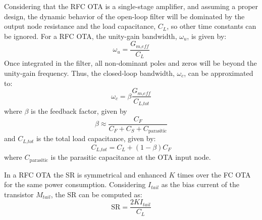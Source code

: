 Considering that the RFC OTA is a single-stage amplifier, and assuming a proper design, the dynamic behavior of the open-loop filter will be dominated by the output node resistance and the load capacitance, $C_L$, so other time constants can be ignored. For a RFC OTA, the unity-gain bandwidth, $\omega_u$, is given by:
\begin{equation}
\omega_u = \frac{G_\textit{m,eff}}{C_L}
\end{equation}
Once integrated in the filter, all non-dominant poles and zeros will be beyond the \mbox{unity-gain} frequency. Thus, the closed-loop bandwidth, $\omega_c$, can be approximated to:
\begin{equation}
\omega_c = \beta \frac{G_\textit{m,eff}}{C_\textit{L,tot}}
\end{equation}
where $\beta$ is the feedback factor, given by
\begin{equation}
\beta \approx \frac{C_F}{C_F+C_S+C_\text{parasitic}}
\end{equation}
and $C_\textit{L,tot}$ is the total load capacitance, given by:
\begin{equation}
C_\textit{L,tot} = C_L + (1-\beta)C_F
\end{equation}
where $C_\text{parasitic}$ is the parasitic capacitance at the OTA input node.

In a RFC OTA the SR is symmetrical and enhanced $K$ times over the FC OTA for the same power consumption. Considering $I_\textit{tail}$ as the bias current of the transistor $M_\textit{tail}$, the SR can be computed as:
\begin{equation}
\text{SR} = \frac{2 K I_\textit{tail}}{C_L}
\end{equation}

